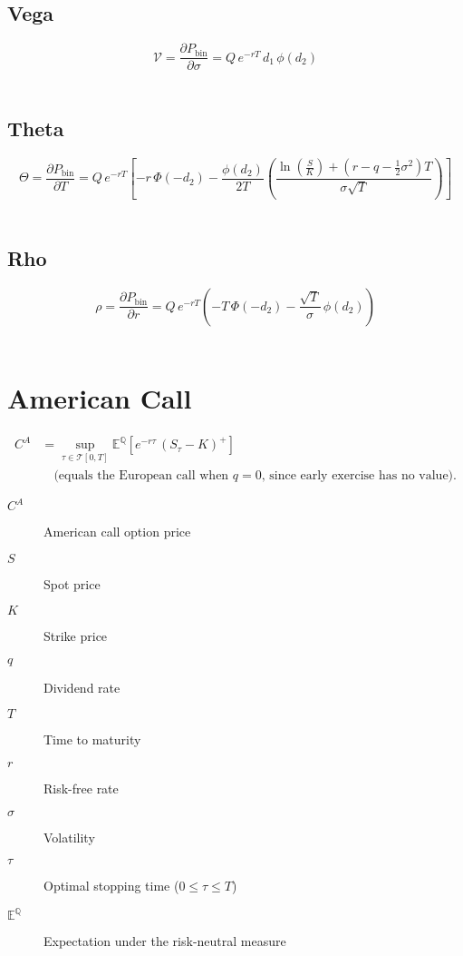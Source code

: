 \documentclass[12pt,a4paper]{article}
\begin{document}
\subsection{Vega}
\[
  \boxed{\mathcal{V} = \frac{\partial P_{\mathrm{bin}}}{\partial \sigma}
  = Q\, e^{-rT}\, d_1\,\phi(d_2)}
\]

\[
  \begin{aligned}
  \end{aligned}
\]

\subsection{Theta}
\[
  \boxed{\Theta = \frac{\partial P_{\mathrm{bin}}}{\partial T}
  = Q\, e^{-rT}\!\left[
  -r\,\Phi(-d_2)
  - \frac{\phi(d_2)}{2T}
    \left(
      \frac{\ln(\tfrac{S}{K}) + (r - q - \tfrac{1}{2}\sigma^2)T}{\sigma\sqrt{T}}
    \right)
  \right]}
\]

\[
  \begin{aligned}
  \end{aligned}
\]

\subsection{Rho}
\[
  \boxed{\rho = \frac{\partial P_{\mathrm{bin}}}{\partial r}
  = Q\, e^{-rT}\!\left(
    -T\,\Phi(-d_2)
    - \frac{\sqrt{T}}{\sigma}\,\phi(d_2)
  \right)}
\]

\[
  \begin{aligned}
  \end{aligned}
\]

\newpage

\section{American Call}

\[
  \begin{aligned}
    C^{A} & = \sup_{\tau \in \mathcal{T}[0,T]} \mathbb{E}^{\mathbb{Q}}\!\left[ e^{-r \tau}\,(S_{\tau}-K)^{+} \right] \\[4pt]
          & \quad \text{(equals the European call when $q=0$, since early exercise has no value).}
  \end{aligned}
\]

\begin{description}
  \item[$C^{A}$] American call option price
  \item[$S$] Spot price
  \item[$K$] Strike price
  \item[$q$] Dividend rate
  \item[$T$] Time to maturity
  \item[$r$] Risk-free rate
  \item[$\sigma$] Volatility
  \item[$\tau$] Optimal stopping time (\( 0 \le \tau \le T \))
  \item[$\mathbb{E}^{\mathbb{Q}}$] Expectation under the risk-neutral measure
\end{description}
\end{document}
